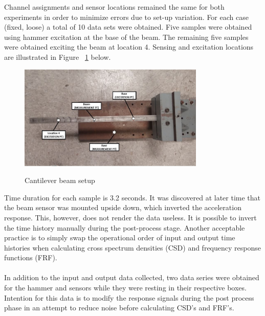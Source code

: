 \documentclass[paper=a4, fontsize=12pt]{scrartcl} %
\begin{document}
%
Channel assignments and sensor locations remained the same for both experiments in order to minimize errors due to set-up variation. For each case (fixed, loose) a total of 10 data sets were obtained. Five samples were obtained using hammer excitation at the base of the beam. The remaining five samples were obtained exciting the beam at location 4. Sensing and excitation locations are illustrated in Figure ~\ref{fig:topShot_mod} below.
%
	\begin{figure}[H]
		\centering
		\includegraphics[height=5.0cm]{TopShot_mod.jpg}
		\label{fig:topShot_mod}
		\caption{Cantilever beam setup}
	\end{figure}
%
Time duration for each sample is 3.2 seconds. It was discovered at later time that the beam sensor was mounted upside down, which inverted the acceleration response. This, however, does not render the data useless. It is possible to invert the time history manually during the post-process stage. Another acceptable practice is to simply swap the operational order of input and output time histories when calculating cross spectrum densities (CSD) and frequency response functions (FRF).
\\
\\
In addition to the input and output data collected, two data series were obtained for the hammer and sensors while they were resting in their respective boxes. Intention for this data is to modify the response signals during the post process phase in an attempt to reduce noise before calculating CSD's and FRF's.
%
%
\end{document}
